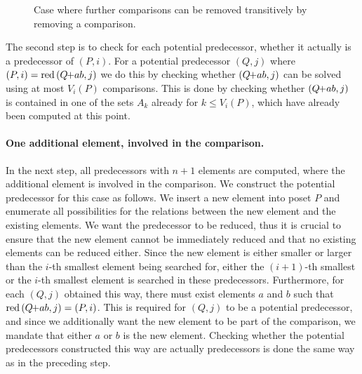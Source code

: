 \documentclass[twoside,leqno,twocolumn]{article}
\newcommand{\pchild}[3]{{#1}\kern-1pt{+}{#2}{#3}}
\newcommand{\reduced}[1]{\operatorname{red}{#1}}
\begin{document}
\begin{figure}[!b]
  \centering
  
  \caption{Case where further comparisons can be removed transitively by removing a comparison.}
  \label{fig:backward_problematic}
\end{figure}

The second step is to check for each potential predecessor, whether it actually is a predecessor of $(P, i)$.
For a potential predecessor $(Q, j)$ where $(P, i) = \reduced{(\pchild{Q}{a}{b}, j)}$ we do this by checking whether $(\pchild{Q}{a}{b}, j)$ can be solved using at most $V_i(P)$ comparisons.
This is done by checking whether $(\pchild{Q}{a}{b}, j)$ is contained in one of the sets $A_k$ already for $k \le V_i(P)$, which have already been computed at this point.


\paragraph{One additional element, involved in the comparison.}
In the next step, all predecessors with $n + 1$ elements are computed, where the additional element is involved in the comparison.
%
%
We construct the potential predecessor for this case as follows.
We insert a new element into poset $P$ and enumerate all possibilities for the relations between the new element and the existing elements.
We want the predecessor to be reduced, thus it is crucial to ensure that the new element cannot be immediately reduced and that no existing elements can be reduced either.
Since the new element is either smaller or larger than the $i$-th smallest element being searched for, either the $(i + 1)$-th smallest or the $i$-th smallest element is searched in these predecessors.
Furthermore, for each $(Q, j)$ obtained this way, there must exist elements $a$ and $b$ such that $\reduced{(\pchild{Q}{a}{b}, j)} = (P, i)$.
This is required for $(Q, j)$ to be a potential predecessor, and since we additionally want the new element to be part of the comparison, we mandate that either $a$ or $b$ is the new element.
Checking whether the potential predecessors constructed this way are actually predecessors is done the same way as in the preceding step.
\end{document}
